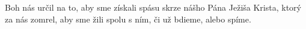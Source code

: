 Boh nás určil na to, aby sme získali spásu skrze nášho Pána Ježiša Krista, ktorý za nás zomrel, aby sme žili spolu s ním, či už bdieme, alebo spíme.
